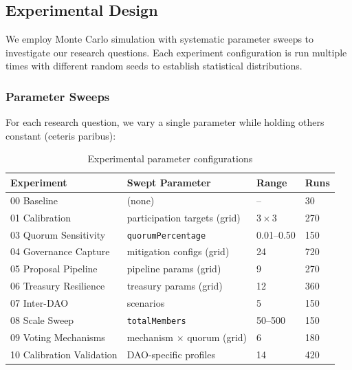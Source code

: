 
\subsection{Experimental Design}

We employ Monte Carlo simulation with systematic parameter sweeps to investigate our research questions. Each experiment configuration is run multiple times with different random seeds to establish statistical distributions.

\subsubsection{Parameter Sweeps}

For each research question, we vary a single parameter while holding others constant (ceteris paribus):

\begin{table}[htbp]
\centering
\caption{Experimental parameter configurations}
\label{tab:experiments}
\small
\begin{tabular}{@{}llll@{}}
\toprule
Experiment & Swept Parameter & Range & Runs \\
\midrule
00 Baseline & (none) & -- & 30 \\
01 Calibration & participation targets (grid) & $3\times3$ & 270 \\
03 Quorum Sensitivity & \texttt{quorumPercentage} & 0.01--0.50 & 150 \\
04 Governance Capture & mitigation configs (grid) & 24 & 720 \\
05 Proposal Pipeline & pipeline params (grid) & 9 & 270 \\
06 Treasury Resilience & treasury params (grid) & 12 & 360 \\
07 Inter-DAO & scenarios & 5 & 150 \\
08 Scale Sweep & \texttt{totalMembers} & 50--500 & 150 \\
09 Voting Mechanisms & mechanism $\times$ quorum (grid) & 6 & 180 \\
10 Calibration Validation & DAO-specific profiles & 14 & 420 \\
\bottomrule
\end{tabular}
\end{table}

